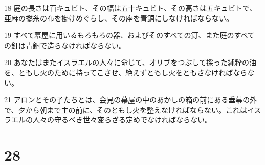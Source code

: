 \par 18 庭の長さは百キュビト、その幅は五十キュビト、その高さは五キュビトで、亜麻の撚糸の布を掛けめぐらし、その座を青銅にしなければならない。
\par 19 すべて幕屋に用いるもろもろの器、およびそのすべての釘、また庭のすべての釘は青銅で造らなければならない。
\par 20 あなたはまたイスラエルの人々に命じて、オリブをつぶして採った純粋の油を、ともし火のために持ってこさせ、絶えずともし火をともさなければならない。
\par 21 アロンとその子たちとは、会見の幕屋の中のあかしの箱の前にある垂幕の外で、夕から朝まで主の前に、そのともし火を整えなければならない。これはイスラエルの人々の守るべき世々変らざる定めでなければならない。

\chapter{28}

